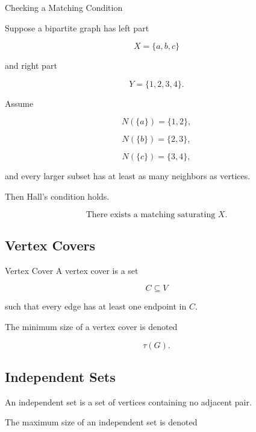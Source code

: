 \begin{workedexamplebox}{Checking a Matching Condition}

Suppose a bipartite graph has left part

\[
X=\{a,b,c\}
\]

and right part

\[
Y=\{1,2,3,4\}.
\]

Assume

\[
N(\{a\})=\{1,2\},
\]

\[
N(\{b\})=\{2,3\},
\]

\[
N(\{c\})=\{3,4\},
\]

and every larger subset has at least as many neighbors as vertices.

Then Hall's condition holds.

\begin{answerbox}
\[
\boxed{
\text{There exists a matching saturating }X.
}
\]
\end{answerbox}

\end{workedexamplebox}

\subsection{Vertex Covers}
\label{subsec:vertex-covers}

\begin{definitionbox}{Vertex Cover}
A vertex cover is a set

\[
C\subseteq V
\]

such that every edge has at least one endpoint in \(C\).
\end{definitionbox}

The minimum size of a vertex cover is denoted

\[
\boxed{
\tau(G).
}
\]

\subsection{Independent Sets}
\label{subsec:independent-sets}

An independent set is a set of vertices containing no adjacent pair.

The maximum size of an independent set is denoted

